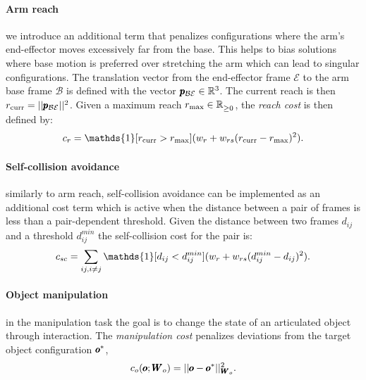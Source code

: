  \paragraph{Arm reach} we introduce an additional term that penalizes configurations where the arm's end-effector moves excessively far from the base. This helps to bias solutions where base motion is preferred over stretching the arm which can lead to singular configurations. The translation vector from the end-effector frame $\mathcal{E}$ to the arm base frame $\mathcal{B}$ is defined with the vector $\pmb{p}_{\mathcal{B}\mathcal{E}} \in \mathbb{R}^{3}$. The current reach is then $r_{\text{curr}} = || \pmb{p}_{\mathcal{B}\mathcal{E}} ||^2$. Given a maximum reach $r_{\text{max}} \in \mathbb{R}^{}_{\geq 0}$, the \textit{reach cost} is then defined by:
 \begin{equation}
   c_r = \mathds{1}[r_{\text{curr}} > r_{\text{max}}] (\weightScalar{r} + \weightScalar{rs}(r_{\text{curr}} - r_{\text{max}})^2).    
 \end{equation}

 \paragraph{Self-collision avoidance} similarly to arm reach, self-collision avoidance can be implemented as an additional cost term which is active when the distance between a pair of frames is less than a pair-dependent threshold. Given the distance between two frames $d_{ij}$ and a threshold $d^{min}_{ij}$ the self-collision cost for the pair is:
 \begin{equation}
   c_{sc} = \sum_{ij, i \neq j} \mathds{1}[d_{ij} < d^{min}_{ij}] (\weightScalar{r} + \weightScalar{rs}(d^{min}_{ij} - d_{ij})^2).    
 \end{equation}
 
 \paragraph{Object manipulation} in the manipulation task the goal is to change the state of an articulated object through interaction. The \textit{manipulation cost} penalizes deviations from the target object configuration $\pmb{o}^{*}$,
\begin{equation}
    c_o(\pmb{o}; \pmb{W}_{o}) = || \pmb{o} - \pmb{o}^{*}||^2_{\pmb{W}_{o}}.
\end{equation}
